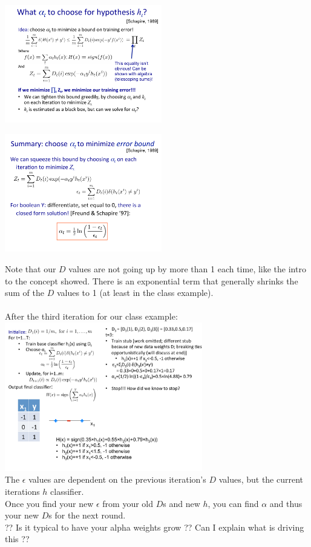 \includegraphics[width=2.7in]{figures/chosing_alpha--telescoping_sums.pdf}

\includegraphics[width=2.7in]{figures/chosing_alpha--telescoping_sums2.pdf}

Note that our $D$ values are not going up by more than 1 each time, like the intro to the concept showed.
There is an exponential term that generally shrinks the sum of the $D$ values to 1 (at least in the class example).  \hfill \\
\hfill \\

After the third iteration for our class example:
\includegraphics[width=3.4in]{figures/boosting_example_3rd_iteration.pdf} \hfill \\
The $\epsilon$ values are dependent on the previous iteration's $D$ values, 
	but the current iterations $h$ classifier. \hfill \\
Once you find your new $\epsilon$ from your old $D$s and new $h$, 
	you can find $\alpha$ and thus your new $D$s for the next round.   \hfill \\
?? Is it typical to have your alpha weights grow ??  Can I explain what is driving this ?? 
\hfill \\
\hfill \\

